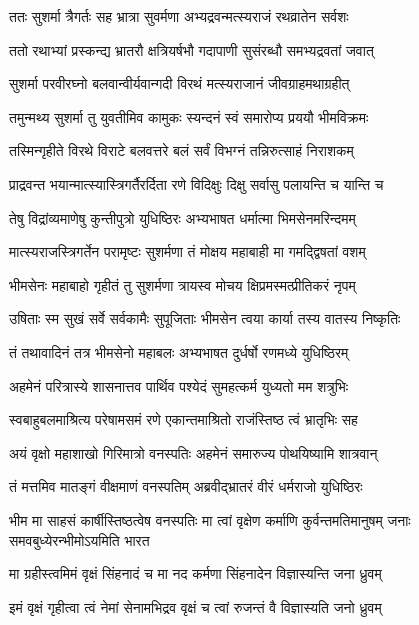 \twolineshloka
{ततः सुशर्मा त्रैगर्तः सह भ्रात्रा सुवर्मणा}
{अभ्यद्रवन्मत्स्यराजं रथव्रातेन सर्वशः}


\twolineshloka
{ततो रथाभ्यां प्रस्कन्द्य भ्रातरौ क्षत्रियर्षभौ}
{गदापाणी सुसंरब्धौ समभ्यद्रवतां जवात्}


\twolineshloka
{सुशर्मा परवीरघ्नो बलवान्वीर्यवान्गदी}
{विरथं मत्स्यराजानं जीवग्राहमथाग्रहीत्}


\twolineshloka
{तमुन्मथ्य सुशर्मा तु युवतीमिव कामुकः}
{स्यन्दनं स्वं समारोप्य प्रययौ भीमविक्रमः}


\twolineshloka
{तस्मिन्गृहीते विरथे विराटे बलवत्तरे}
{बलं सर्वं विभग्नं तन्निरुत्साहं निराशकम्}


\twolineshloka
{प्राद्रवन्त भयान्मात्स्यास्त्रिगर्तैरर्दिता रणे}
{विदिक्षुः दिक्षु सर्वासु पलायन्ति च यान्ति च}


\twolineshloka
{तेषु विद्रांव्यमाणेषु कुन्तीपुत्रो युधिष्ठिरः}
{अभ्यभाषत धर्मात्मा भिमसेनमरिन्दमम्}


\twolineshloka
{मात्स्यराजस्त्रिगर्तेन परामृष्टः सुशर्मणा}
{तं मोक्षय महाबाही मा गमद्द्विषतां वशम्}


\twolineshloka
{भीमसेनः महाबाहो गृहीतं तु सुशर्मणा}
{त्रायस्व मोचय क्षिप्रमस्मत्प्रीतिकरं नृपम्}


\twolineshloka
{उषिताः स्म सुखं सर्वे सर्वकामैः सुपूजिताः}
{भीमसेन त्वया कार्या तस्य वातस्य निष्कृतिः}



\twolineshloka
{तं तथावादिनं तत्र भीमसेनो महाबलः}
{अभ्यभाषत दुर्धर्षो रणमध्ये युधिष्ठिरम्}


\twolineshloka
{अहमेनं परित्रास्ये शासनात्तव पार्थिव}
{पश्येदं सुमहत्कर्म युध्यतो मम शत्रुभिः}


\twolineshloka
{स्वबाहुबलमाश्रित्य परेषामसमं रणे}
{एकान्तमाश्रितो राजंस्तिष्ठ त्वं भ्रातृभिः सह}


\twolineshloka
{अयं वृक्षो महाशाखो गिरिमात्रो वनस्पतिः}
{अहमेनं समारुज्य पोथयिष्यामि शात्रवान्}



\twolineshloka
{तं मत्तमिव मातङ्गं वीक्षमाणं वनस्पतिम्}
{अब्रवीद्भ्रातरं वीरं धर्मराजो युधिष्ठिरः}


\onelineshloka
{भीम मा साहसं कार्षीस्तिष्ठत्वेष वनस्पतिः}
\twolineshloka
{मा त्वां वृक्षेण कर्माणि कुर्वन्तमतिमानुषम्}
{जनाः समवबुध्येरन्भीमोऽयमिति भारत}


\twolineshloka
{मा ग्रहीस्त्वमिमं वृक्षं सिंहनादं च मा नद}
{कर्मणा सिंहनादेन विज्ञास्यन्ति जना ध्रुवम्}


\twolineshloka
{इमं वृक्षं गृहीत्वा त्वं नेमां सेनामभिद्रव}
{वृक्षं च त्वां रुजन्तं वै विज्ञास्यति जनो ध्रुवम्}


